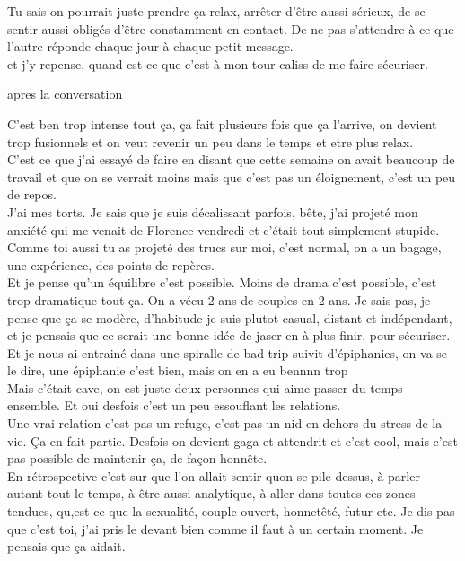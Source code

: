 Tu sais on pourrait juste prendre ça relax, arrêter d'être aussi sérieux,
de se sentir aussi obligés d'être constamment en contact. De ne pas s'attendre
à ce que l'autre réponde chaque jour à chaque petit message. \\

et j'y repense, quand est ce que c'est à mon tour caliss de me faire
sécuriser. 

\newpage

apres la conversation

C'est ben trop intense tout ça, ça fait plusieurs fois que ça
l'arrive, on devient trop fusionnels et on veut revenir un peu
dans le temps et etre plus relax.\\

C'est ce que j'ai essayé de faire en disant que cette semaine
on avait beaucoup de travail et que on se verrait moins mais
que c'est pas un éloignement, c'est un peu de repos.\\


J'ai mes torts. Je sais que je suis décalissant parfois, bête, j'ai projeté 
mon anxiété qui me venait de Florence vendredi et c'était
tout simplement stupide.\\

Comme toi aussi tu as projeté des trucs sur moi, c'est normal,
on a un bagage, une expérience, des points de repères.\\

Et je pense qu'un équilibre c'est possible. Moins de drama
c'est possible, c'est trop dramatique tout ça. On a vécu 
2 ans de couples en 2 ans. Je sais pas, je pense que ça se modère,
d'habitude je suis plutot casual, distant et indépendant,
et je pensais que ce serait une bonne idée de jaser en à plus
finir, pour sécuriser. Et je nous ai entrainé dans une spiralle
de bad trip suivit d'épiphanies, on va se le dire, une épiphanie
c'est bien, mais on en a eu bennnn trop\\

Mais c'était cave, on est juste deux personnes qui aime passer du temps
ensemble. Et oui desfois c'est un peu essouflant les relations.\\


Une vrai relation c'est pas un refuge, c'est pas un nid en dehors du
stress de la vie. Ça en fait partie. Desfois on devient gaga et
attendrit et c'est cool, mais c'est pas possible de maintenir ça,
de façon honnête.\\

En rétrospective c'est sur que l'on allait sentir quon se pile dessus,
à parler autant tout le temps, à être aussi analytique, à aller dans
toutes ces zones tendues, qu,est ce que la sexualité, couple ouvert,
honnetêté, futur etc. Je dis pas que c'est toi, j'ai pris le devant
bien comme il faut à un certain moment. Je pensais que ça aidait.\\

